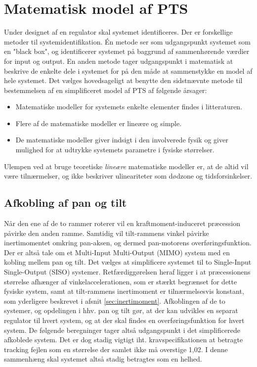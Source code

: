 \section{Matematisk model af PTS}
\label{sec:matPTS}
Under designet af en regulator skal systemet identificeres. Der er forskellige metoder til systemidentifikation.
Én metode ser som udgangspunkt systemet som en "black box", og identificerer systemet
på baggrund af sammenhørende værdier for input og output.
En anden metode tager udgangspunkt i matematisk at beskrive de enkelte dele i systemet
for på den måde at sammenstykke en model af hele systemet.
Det vælges hovedsageligt at benytte den sidstnævnte metode til bestemmelsen af en simplificeret
model af PTS af følgende årsager:
\begin{itemize}
\itemsep1pt
\item Matematiske modeller for systemets enkelte elementer findes i litteraturen.
\item Flere af de matematiske modeller er lineære og simple.
\item De matematiske modeller giver indsigt i den involverede fysik og giver mulighed
	for at udtrykke systemets parametre i fysiske størrelser.
\end{itemize}
Ulempen ved at bruge teoretiske \textit{lineære} matematiske modeller er,
at de altid vil være tilnærmelser, og ikke beskriver ulineariteter som dødzone og tidsforsinkelser.

\subsection{Afkobling af pan og tilt}
Når den ene af de to rammer roterer vil en kraftmoment-induceret præcession påvirke den anden ramme.
Samtidig vil tilt-rammens vinkel påvirke inertimomentet omkring pan-aksen, og dermed
pan-motorens overføringsfunktion.
Der er altså tale om et Multi-Input Multi-Output (MIMO) system med en kobling mellem pan og tilt.
Det vælges at simplificere systemet til to Single-Input Single-Output (SISO) systemer. %
Retfærdiggørelsen heraf ligger i at præcessionens størrelse afhænger af vinkelaccelerationen, som er stærkt begrænset
for dette fysiske system, samt at tilt-rammens inertimoment er tilnærmelsesvis konstant, som yderligere beskrevet i afsnit \ref{sec:inertimoment}.
Afkoblingen af de to systemer, og opdelingen i hhv. pan og tilt gør, at der kan udvikles en separat regulator
til hvert system, og at der skal findes en overføringsfunktion for hvert system.
De følgende beregninger tager altså udgangspunkt i det simplificerede afkoblede system.
Det er dog stadig vigtigt iht. kravspecifikationen at betragte tracking fejlen som en størrelse der samlet
ikke må overstige 1,02\degree. I denne sammenhæng skal systemet altså stadig betragtes som en helhed.

